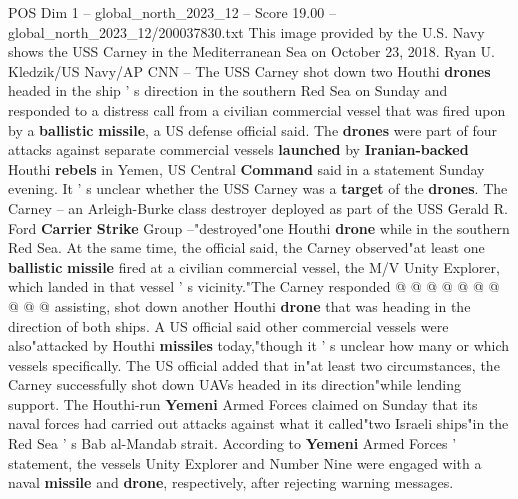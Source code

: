 \begin{textsample}{POS Dim 1 – global\_north\_2023\_12 – Score 19.00 – global\_north\_2023\_12/200037830.txt}  \label{ex:f1_pos_257}
This image provided by the U.S.
Navy shows the USS Carney in the Mediterranean Sea on October 23, 2018.
Ryan U.
Kledzik/US Navy/AP CNN -- The USS Carney shot down two Houthi \textbf{drones} headed in the ship ' s direction in the southern Red Sea on Sunday and responded to a distress call from a civilian commercial vessel that was fired upon by a \textbf{ballistic} \textbf{missile}, a US defense official said.
The \textbf{drones} were part of four attacks against separate commercial vessels \textbf{launched} by \textbf{Iranian-backed} Houthi \textbf{rebels} in Yemen, US Central \textbf{Command} said in a statement Sunday evening.
It ' s unclear whether the USS Carney was a \textbf{target} of the \textbf{drones}.
The Carney -- an Arleigh-Burke class destroyer deployed as part of the USS Gerald R.
Ford \textbf{Carrier} \textbf{Strike} Group --"destroyed"one Houthi \textbf{drone} while in the southern Red Sea.
At the same time, the official said, the Carney observed"at least one \textbf{ballistic} \textbf{missile} fired at a civilian commercial vessel, the M/V Unity Explorer, which landed in that vessel ' s vicinity."The Carney responded @ @ @ @ @ @ @ @ @ @ assisting, shot down another Houthi \textbf{drone} that was heading in the direction of both ships.
A US official said other commercial vessels were also"attacked by Houthi \textbf{missiles} today,"though it ' s unclear how many or which vessels specifically.
The US official added that in"at least two circumstances, the Carney successfully shot down UAVs headed in its direction"while lending support.
The Houthi-run \textbf{Yemeni} Armed Forces claimed on Sunday that its naval forces had carried out attacks against what it called"two Israeli ships"in the Red Sea ' s Bab al-Mandab strait.
According to \textbf{Yemeni} Armed Forces ' statement, the vessels Unity Explorer and Number Nine were engaged with a naval \textbf{missile} and \textbf{drone}, respectively, after rejecting warning messages.

\end{textsample}
